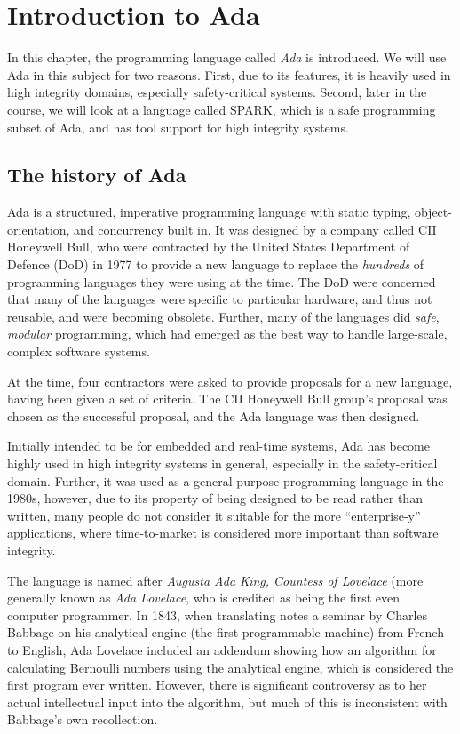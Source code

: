 \chapter{Introduction to Ada}

In this chapter, the programming language called \emph{Ada} is introduced. We will use Ada in this subject for two reasons. First, due to its features, it is heavily used in high integrity domains, especially safety-critical systems. Second, later in the course, we will look at a language called SPARK, which is a safe programming subset of Ada, and has tool support for high integrity systems.

\section{The history of Ada}

Ada is a structured, imperative programming language with static typing, object-orientation, and concurrency built in. It was designed by a company called CII Honeywell Bull, who were contracted by the United States Department of Defence (DoD) in 1977 to provide a new language to replace the \emph{hundreds} of programming languages they were using at the time. The DoD were concerned that many of the languages were specific to particular hardware, and thus not reusable, and were becoming obsolete. Further, many of the languages did \emph{safe}, \emph{modular} programming, which had emerged as the best way to handle large-scale, complex software systems.

At the time, four contractors were asked to provide proposals for a new language, having been given a set of criteria. The  CII Honeywell Bull group's proposal was chosen as the successful proposal, and the Ada language was then designed.

Initially intended to be for embedded and real-time systems, Ada has become highly used in high integrity systems in general, especially in the safety-critical domain. Further, it was used as a general purpose programming language in the 1980s, however, due to its property of being designed to be read rather than written, many people do not consider it suitable for the more ``enterprise-y'' applications, where time-to-market is considered more important than software integrity.

The language is named after \emph{Augusta Ada King, Countess of Lovelace} (more generally known as \emph{Ada Lovelace}, who is credited as being the first even computer programmer. In 1843, when translating notes a seminar by Charles Babbage on his analytical engine (the first programmable machine) from French to English, Ada Lovelace included an addendum showing how an algorithm for calculating Bernoulli numbers using the analytical engine, which is considered the first program ever written. However, there is significant controversy as to her actual intellectual input into the algorithm, but much of this is inconsistent with Babbage's own recollection.



